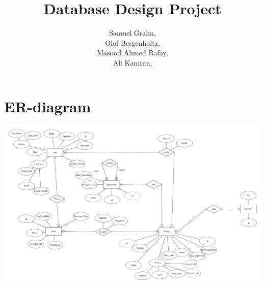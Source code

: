 \documentclass{article}
\title{Database Design Project}
\author{
  Samuel Grahn, \email{samuel.grahn@outlook.com}\\
  Olof Bergenholtz, \email{obergenholtz@gmail.com}\\
  Masood Ahmed Rafay, \email{Rafayqureshi2010@gmail.com}\\
  Ali Kamran, \email{alkmrn1@gmail.com}\\
}
\begin{document}
\maketitle
\newpage
\section*{ER-diagram}
\includegraphics[width=\linewidth]{er.png}
%
\end{document}
